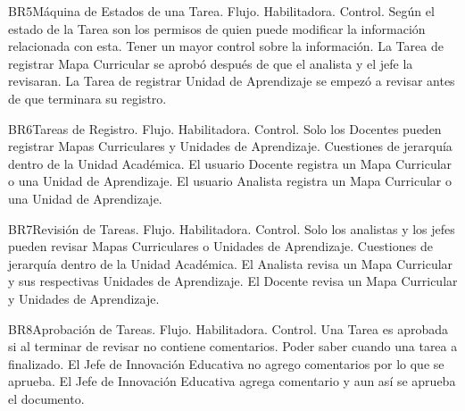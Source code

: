 \begin{BussinesRule}{BR5}{Máquina de Estados de una Tarea.}
    \BRitem[Tipo:] Flujo.
    \BRitem[Clase:] Habilitadora.
    \BRitem[Nivel:] Control.
    \BRitem[Descripción:] Según el estado de la Tarea son los permisos de quien puede modificar la información relacionada con esta.
    \BRitem[Motivación:] Tener un mayor control sobre la información.
     La Tarea de registrar Mapa Curricular se aprobó después de que el analista y el jefe la revisaran.
     La Tarea de registrar Unidad de Aprendizaje se empezó a revisar antes de que terminara su registro.
\end{BussinesRule}
\begin{BussinesRule}{BR6}{Tareas de Registro.}
    \BRitem[Tipo:] Flujo.
    \BRitem[Clase:] Habilitadora.
    \BRitem[Nivel:] Control.
    \BRitem[Descripción:] Solo los Docentes pueden registrar Mapas Curriculares y Unidades de Aprendizaje.
    \BRitem[Motivación:] Cuestiones de jerarquía dentro de la Unidad Académica.
     El usuario Docente registra un Mapa Curricular o una Unidad de Aprendizaje.
     El usuario Analista registra un Mapa Curricular o una Unidad de Aprendizaje.
\end{BussinesRule}
\begin{BussinesRule}{BR7}{Revisión de Tareas.}
    \BRitem[Tipo:] Flujo.
    \BRitem[Clase:] Habilitadora.
    \BRitem[Nivel:] Control.
    \BRitem[Descripción:] Solo los analistas y los jefes  pueden revisar Mapas Curriculares o Unidades de Aprendizaje.
    \BRitem[Motivación:] Cuestiones de jerarquía dentro de la Unidad Académica.
     El Analista revisa un Mapa Curricular y sus respectivas Unidades de Aprendizaje.
     El Docente revisa un Mapa Curricular y Unidades de Aprendizaje.
\end{BussinesRule}
\begin{BussinesRule}{BR8}{Aprobación de Tareas.}
    \BRitem[Tipo:] Flujo.
    \BRitem[Clase:] Habilitadora.
    \BRitem[Nivel:] Control.
    \BRitem[Descripción:] Una Tarea es aprobada si al terminar de revisar no contiene comentarios.
    \BRitem[Motivación:] Poder saber cuando una tarea a finalizado.
     El Jefe de Innovación Educativa no agrego comentarios por lo que se aprueba.
     El Jefe de Innovación Educativa agrega comentario y aun así se aprueba el documento.
\end{BussinesRule}
